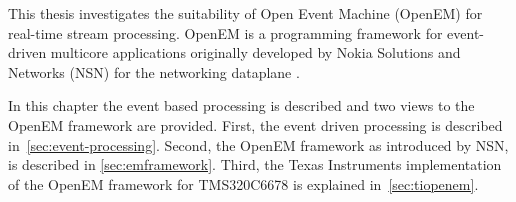 This thesis investigates the suitability of Open Event Machine (OpenEM) for real-time stream processing. OpenEM is a programming framework for event-driven multicore applications originally developed by Nokia Solutions and Networks (NSN) for the networking dataplane \cite{openemintro}. 

In this chapter the event based processing is described and two views to the OpenEM framework are provided. First, the event driven processing is described in~\ref{sec:event-processing}. Second, the OpenEM framework as introduced by NSN, is described in \ref{sec:emframework}. Third, the Texas Instruments implementation of the OpenEM framework for TMS320C6678 is explained in~\ref{sec:tiopenem}.
